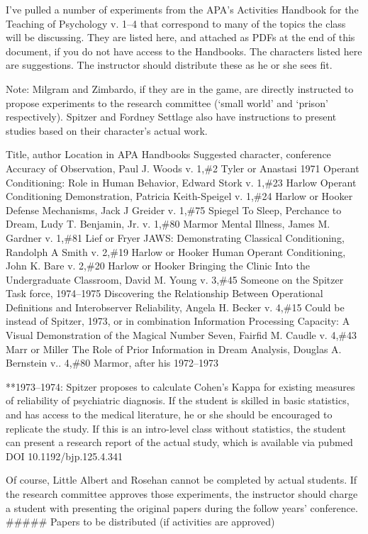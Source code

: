 I've pulled a number of experiments from the APA's Activities Handbook for the Teaching of Psychology v. 1--4 that correspond to many of the topics the class will be discussing. They are listed here, and attached as PDFs at the end of this document, if you do not have access to the Handbooks. The characters listed here are suggestions. The instructor should distribute these as he or she sees fit.

Note: Milgram and Zimbardo, if they are in the game, are directly instructed to propose experiments to the research committee (`small world' and `prison' respectively). Spitzer and Fordney Settlage also have instructions to present studies based on their character's actual work. 

Title, author
Location in APA Handbooks
Suggested character, conference
Accuracy of Observation, Paul J. Woods
v. 1,\#2
Tyler or Anastasi 1971
Operant Conditioning: Role in Human Behavior, Edward Stork
v. 1,\#23
Harlow
Operant Conditioning Demonstration, Patricia Keith-Speigel
v. 1,\#24
Harlow or Hooker
Defense Mechanisms, Jack J Greider
v. 1,\#75
Spiegel
To Sleep, Perchance to Dream, Ludy T. Benjamin, Jr.
v. 1,\#80
Marmor
Mental Illness, James M. Gardner
v. 1,\#81
Lief or Fryer
JAWS: Demonstrating Classical Conditioning, Randolph A Smith
v. 2,\#19
Harlow or Hooker
Human Operant Conditioning, John K. Bare
v. 2,\#20
Harlow or Hooker
Bringing the Clinic Into the Undergraduate Classroom, David M. Young
v. 3,\#45
Someone on the Spitzer Task force, 1974--1975
Discovering the Relationship Between Operational Definitions and Interobserver Reliability, Angela H. Becker
v. 4,\#15
Could be instead of Spitzer, 1973, or in combination
Information Processing Capacity: A Visual Demonstration of the Magical Number Seven, Fairfid M. Caudle
v. 4,\#43
Marr or Miller
The Role of Prior Information in Dream Analysis, Douglas A. Bernstein
v.. 4,\#80
Marmor, after his 1972--1973

**1973--1974: Spitzer proposes to calculate Cohen's Kappa for existing measures of reliability of psychiatric diagnosis. If the student is skilled in basic statistics, and has access to the medical literature, he or she should be encouraged to replicate the study. If this is an intro-level class without statistics, the student can present a research report of the actual study, which is available via pubmed DOI 10.1192\slash bjp.125.4.341

Of course, Little Albert and Rosehan cannot be completed by actual students. If the research committee approves those experiments, the instructor should charge a student with presenting the original papers during the follow years' conference.
 \#\#\#\#\# Papers to be distributed (if activities are approved)

